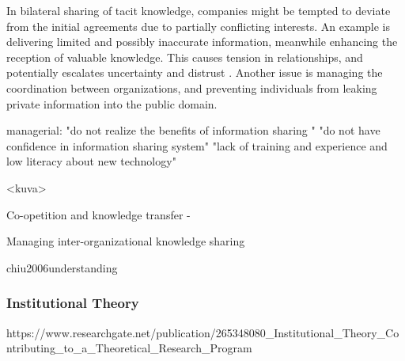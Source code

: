 In bilateral sharing of tacit knowledge, companies might be tempted to deviate from the initial agreements due to partially conflicting interests. An example is delivering limited and possibly inaccurate information, meanwhile enhancing the reception of valuable knowledge. This causes tension in relationships, and potentially escalates uncertainty and distrust \cite{hsu2014examining}. Another issue is managing the coordination between organizations, and preventing individuals from leaking private information into the public domain. 










managerial: 
"do not realize the benefits of information sharing "
"do not have confidence in information sharing system"
"lack of training and experience and low literacy about new technology"

<kuva>





Co-opetition and knowledge transfer %
-



Managing inter-organizational knowledge sharing



chiu2006understanding



\subsubsection{Institutional Theory}
https://www.researchgate.net/publication/265348080_Institutional_Theory_Contributing_to_a_Theoretical_Research_Program






